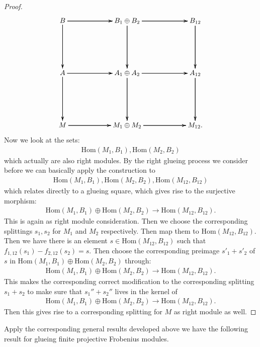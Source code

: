 \documentclass[12pt]{amsart}
\theoremstyle{definition}
\numberwithin{equation}{section}
\begin{document}
\begin{proof}
\[
\xymatrix@R+3pc@C+3pc{
B \ar[r] \ar[r] \ar[r] \ar[d] \ar[d] \ar[d] &B_1\oplus B_2 \ar[r] \ar[r] \ar[r] \ar[d] \ar[d] \ar[d] &B_{12} \ar[d] \ar[d] \ar[d]\\
A \ar[r] \ar[r] \ar[r] \ar[d] \ar[d] \ar[d] &A_1\oplus A_2 \ar[r] \ar[r] \ar[r] \ar[d] \ar[d] \ar[d] &A_{12} \ar[d] \ar[d] \ar[d]\\
M \ar[r] \ar[r] \ar[r]  &M_1\oplus M_2 \ar[r] \ar[r] \ar[r]  &M_{12}. \\
}
\]
Now we look at the sets:
\begin{align}
\mathrm{Hom}(M_1,B_1),\mathrm{Hom}(M_2,B_2)	
\end{align}
which actually are also right modules. By the right glueing process we consider before we can basically apply the construction to 
\begin{align}
\mathrm{Hom}(M_1,B_1),\mathrm{Hom}(M_2,B_2),\mathrm{Hom}(M_{12},B_{12}) 	
\end{align}	
which relates directly to a glueing square, which gives rise to the surjective morphism:
\begin{align}
\mathrm{Hom}(M_1,B_1)\oplus\mathrm{Hom}(M_2,B_2)\rightarrow \mathrm{Hom}(M_{12},B_{12}).	
\end{align}	
This is again as right module consideration. Then we choose the corresponding splittings $s_1,s_2$ for $M_1$ and $M_2$ respectively. Then map them to $\mathrm{Hom}(M_{12},B_{12})$. Then we have there is an element $s\in \mathrm{Hom}(M_{12},B_{12})$ such that $f_{1,12}(s_1)-f_{2,12}(s_2)=s$. Then choose the corresponding preimage $s'_1+s'_2$ of $s$ in $\mathrm{Hom}(M_1,B_1)\oplus\mathrm{Hom}(M_2,B_2)$ through:
\begin{align}
\mathrm{Hom}(M_1,B_1)\oplus\mathrm{Hom}(M_2,B_2)\rightarrow \mathrm{Hom}(M_{12},B_{12}).	
\end{align}
This makes the corresponding correct modification to the corresponding splitting $s_1+s_2$ to make sure that $s_1''+s_2''$ lives in the kernel of 
\begin{align}
\mathrm{Hom}(M_1,B_1)\oplus\mathrm{Hom}(M_2,B_2)\rightarrow \mathrm{Hom}(M_{12},B_{12}).	
\end{align}
Then this gives rise to a corresponding splitting for $M$ as right module as well.


 
\end{proof}




\indent Apply the corresponding general results developed above we have the following result for glueing finite projective Frobenius modules.
\end{document}
